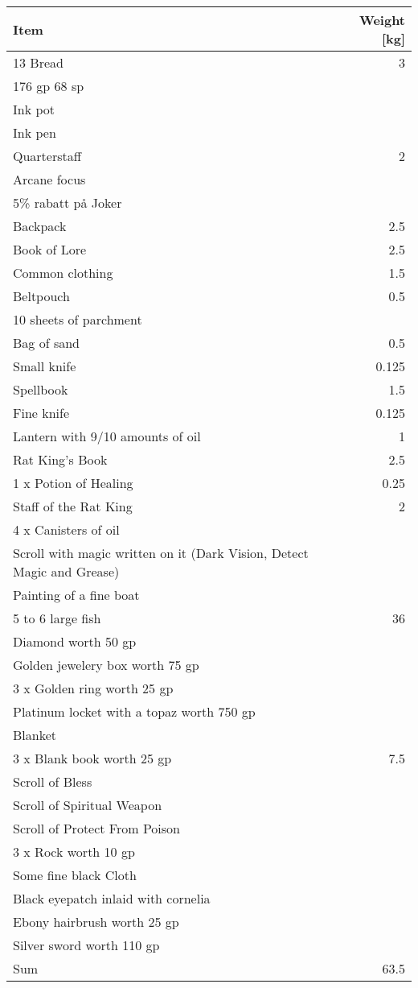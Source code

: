 \documentclass[11pt]{article}
\begin{document}
	\begin{tabularx}{\textwidth}{X|r}
Item & Weight [kg] \\
\hline
13 Bread \dotfill 							& 3 	\\
176 gp 68 sp								& 		\\
Ink pot 									& 		\\
Ink pen 									& 		\\
Quarterstaff \dotfill 						& 2 	\\
Arcane focus 								& 		\\
5\% rabatt på Joker 						& 		\\
Backpack \dotfill 							& 2.5 	\\
Book of Lore \dotfill 						& 2.5 	\\
Common clothing \dotfill 					& 1.5 	\\
Beltpouch \dotfill 							& 0.5 	\\
10 sheets of parchment 						& 		\\
Bag of sand \dotfill 						& 0.5 	\\
Small knife \dotfill 						& 0.125 \\
Spellbook \dotfill 							& 1.5 	\\
Fine knife \dotfill 						& 0.125	\\
Lantern with 9/10 amounts of oil \dotfill 	& 1 	\\
Rat King's Book \dotfill 					& 2.5 	\\
1 x Potion of Healing \dotfill				& 0.25	\\
Staff of the Rat King \dotfill				& 2		\\
4 x Canisters of oil						&		\\
Scroll with magic written on it	(Dark Vision, Detect Magic and Grease)			&		\\
Painting of a fine boat						&		\\
5 to 6 large fish \dotfill					& 36	\\
Diamond worth 50 gp							&		\\
Golden jewelery box worth 75 gp				&		\\
3 x Golden ring worth 25 gp					&		\\
Platinum locket with a topaz worth 750 gp	&		\\
Blanket										&		\\
3 x Blank book worth 25 gp \dotfill			& 7.5	\\
Scroll of Bless								&		\\
Scroll of Spiritual Weapon					&		\\
Scroll of Protect From Poison				&		\\
3 x Rock worth 10 gp						&		\\
Some fine black Cloth						&		\\
Black eyepatch inlaid with cornelia			&		\\
Ebony hairbrush worth 25 gp					&		\\
Silver sword worth 110 gp					&		\\
\hline
Sum 										& 63.5
	\end{tabularx}
\end{document}
